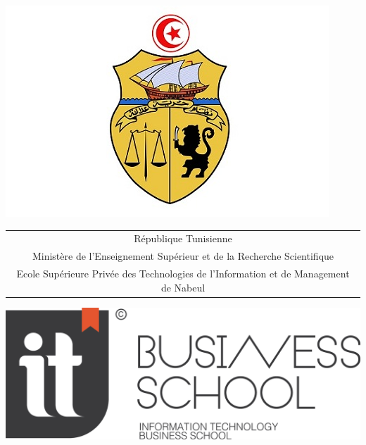 \documentclass[a4paper, oneside, 12pt, final]{extreport}
\title{\reportSubject}
\author{\reportAuthor}
\newcommand{\reportTitle} {%
  \textsc{Projet de Fin d'\'etudes}
}
\newcommand{\ITBS} {%
\\ Ecole Supérieure Privée des Technologies de l'Information et de Management de Nabeul
}
\begin{document}
\thispagestyle{empty}
\begin{titlepage}
\begin{center}



\includegraphics[scale=0.20]{embleme.jpg}
\vspace{0.5cm}

{%
  \fontsize{9pt}{9pt}\selectfont%
  \begin{tabular}{c}
    R\'epublique Tunisienne \\
    Minist\`ere de l'Enseignement Supérieur et de la Recherche Scientifique   \ITBS{}\\ 
  \end{tabular}
}

\vspace{1cm}

\includegraphics[scale=0.1]{logonoir.png}



\vspace{10pt} {%
  \renewcommand*{\familydefault}{\defaultFont}
  \fontsize{46pt}{46pt}\selectfont%
}


\end{center}
\end{titlepage}
\end{document}
